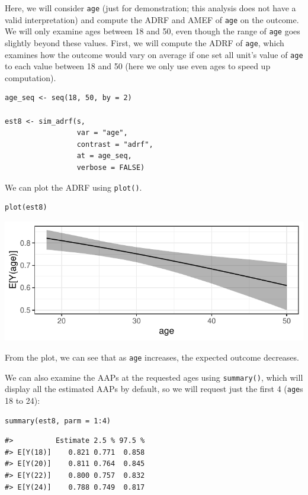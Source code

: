 Here, we will consider \texttt{age} (just for demonstration; this analysis does not have a valid interpretation) and compute the ADRF and AMEF of \texttt{age} on the outcome. We will only examine ages between 18 and 50, even though the range of \texttt{age} goes slightly beyond these values. First, we will compute the ADRF of \texttt{age}, which examines how the outcome would vary on average if one set all unit's value of \texttt{age} to each value between 18 and 50 (here we only use even ages to speed up computation).

\begin{verbatim}
age_seq <- seq(18, 50, by = 2)

est8 <- sim_adrf(s,
                 var = "age",
                 contrast = "adrf",
                 at = age_seq,
                 verbose = FALSE)
\end{verbatim}

We can plot the ADRF using \texttt{plot()}.

\begin{verbatim}
plot(est8)
\end{verbatim}

\begin{center}\includegraphics{figures/plot8-1} \end{center}

From the plot, we can see that as \texttt{age} increases, the expected outcome decreases.

We can also examine the AAPs at the requested ages using \texttt{summary()}, which will display all the estimated AAPs by default, so we will request just the first 4 (\texttt{age}s 18 to 24):

\begin{verbatim}
summary(est8, parm = 1:4)
\end{verbatim}

\begin{verbatim}
#>          Estimate 2.5 % 97.5 %
#> E[Y(18)]    0.821 0.771  0.858
#> E[Y(20)]    0.811 0.764  0.845
#> E[Y(22)]    0.800 0.757  0.832
#> E[Y(24)]    0.788 0.749  0.817
\end{verbatim}

